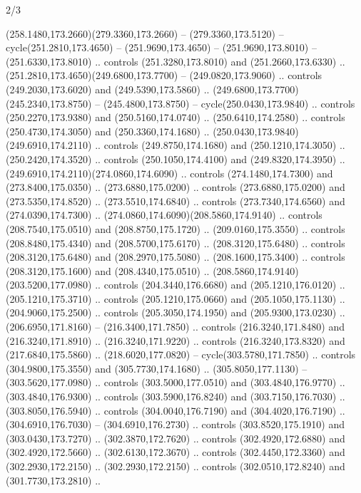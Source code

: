 \begin{flagdescription}{2/3}
\begin{scope}[xshift=0.5\flaglength,yshift=0.5\flagwidth,scale=\flagwidth/259.2]
\begin{scope}[y=0.8pt, x=0.8pt, yscale=-1,shift={(-243,-162)}]
      (258.1480,173.2660)(279.3360,173.2660) -- (279.3360,173.5120) --
      cycle(251.2810,173.4650) -- (251.9690,173.4650) -- (251.9690,173.8010) --
      (251.6330,173.8010) .. controls (251.3280,173.8010) and (251.2660,173.6330) ..
      (251.2810,173.4650)(249.6800,173.7700) -- (249.0820,173.9060) .. controls
      (249.2030,173.6020) and (249.5390,173.5860) ..
      (249.6800,173.7700)(245.2340,173.8750) -- (245.4800,173.8750) --
      cycle(250.0430,173.9840) .. controls (250.2270,173.9380) and
      (250.5160,174.0740) .. (250.6410,174.2580) .. controls (250.4730,174.3050) and
      (250.3360,174.1680) .. (250.0430,173.9840)(249.6910,174.2110) .. controls
      (249.8750,174.1680) and (250.1210,174.3050) .. (250.2420,174.3520) .. controls
      (250.1050,174.4100) and (249.8320,174.3950) ..
      (249.6910,174.2110)(274.0860,174.6090) .. controls (274.1480,174.7300) and
      (273.8400,175.0350) .. (273.6880,175.0200) .. controls (273.6880,175.0200) and
      (273.5350,174.8520) .. (273.5510,174.6840) .. controls (273.7340,174.6560) and
      (274.0390,174.7300) .. (274.0860,174.6090)(208.5860,174.9140) .. controls
      (208.7540,175.0510) and (208.8750,175.1720) .. (209.0160,175.3550) .. controls
      (208.8480,175.4340) and (208.5700,175.6170) .. (208.3120,175.6480) .. controls
      (208.3120,175.6480) and (208.2970,175.5080) .. (208.1600,175.3400) .. controls
      (208.3120,175.1600) and (208.4340,175.0510) ..
      (208.5860,174.9140)(203.5200,177.0980) .. controls (204.3440,176.6680) and
      (205.1210,176.0120) .. (205.1210,175.3710) .. controls (205.1210,175.0660) and
      (205.1050,175.1130) .. (204.9060,175.2500) .. controls (205.3050,174.1950) and
      (205.9300,173.0230) .. (206.6950,171.8160) -- (216.3400,171.7850) .. controls
      (216.3240,171.8480) and (216.3240,171.8910) .. (216.3240,171.9220) .. controls
      (216.3240,173.8320) and (217.6840,175.5860) .. (218.6020,177.0820) --
      cycle(303.5780,171.7850) .. controls (304.9800,175.3550) and
      (305.7730,174.1680) .. (305.8050,177.1130) -- (303.5620,177.0980) .. controls
      (303.5000,177.0510) and (303.4840,176.9770) .. (303.4840,176.9300) .. controls
      (303.5900,176.8240) and (303.7150,176.7030) .. (303.8050,176.5940) .. controls
      (304.0040,176.7190) and (304.4020,176.7190) .. (304.6910,176.7030) --
      (304.6910,176.2730) .. controls (303.8520,175.1910) and (303.0430,173.7270) ..
      (302.3870,172.7620) .. controls (302.4920,172.6880) and (302.4920,172.5660) ..
      (302.6130,172.3670) .. controls (302.4450,172.3360) and (302.2930,172.2150) ..
      (302.2930,172.2150) .. controls (302.0510,172.8240) and (301.7730,173.2810) ..

\end{scope}
\end{scope}
\end{flagdescription}
